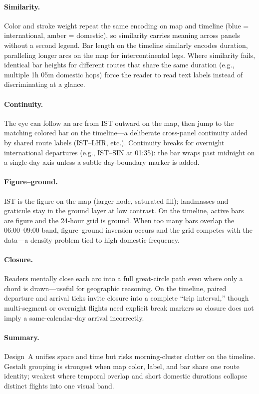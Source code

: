 \documentclass[11pt]{article}
\begin{document}
\paragraph{Similarity.}
Color and stroke weight repeat the same encoding on map and timeline (blue = international, amber = domestic), so similarity carries meaning across panels without a second legend. Bar length on the timeline similarly encodes duration, paralleling longer arcs on the map for intercontinental legs. Where similarity fails, identical bar heights for different routes that share the same duration (e.g., multiple 1h 05m domestic hops) force the reader to read text labels instead of discriminating at a glance.

\paragraph{Continuity.}
The eye can follow an arc from IST outward on the map, then jump to the matching colored bar on the timeline---a deliberate cross-panel continuity aided by shared route labels (IST--LHR, etc.). Continuity breaks for overnight international departures (e.g., IST--SIN at 01:35): the bar wraps past midnight on a single-day axis unless a subtle day-boundary marker is added.

\paragraph{Figure--ground.}
IST is the figure on the map (larger node, saturated fill); landmasses and graticule stay in the ground layer at low contrast. On the timeline, active bars are figure and the 24-hour grid is ground. When too many bars overlap the 06:00--09:00 band, figure--ground inversion occurs and the grid competes with the data---a density problem tied to high domestic frequency.

\paragraph{Closure.}
Readers mentally close each arc into a full great-circle path even where only a chord is drawn---useful for geographic reasoning. On the timeline, paired departure and arrival ticks invite closure into a complete ``trip interval,'' though multi-segment or overnight flights need explicit break markers so closure does not imply a same-calendar-day arrival incorrectly.

\paragraph{Summary.}
Design~A unifies space and time but risks morning-cluster clutter on the timeline. Gestalt grouping is strongest when map color, label, and bar share one route identity; weakest where temporal overlap and short domestic durations collapse distinct flights into one visual band.
\end{document}
